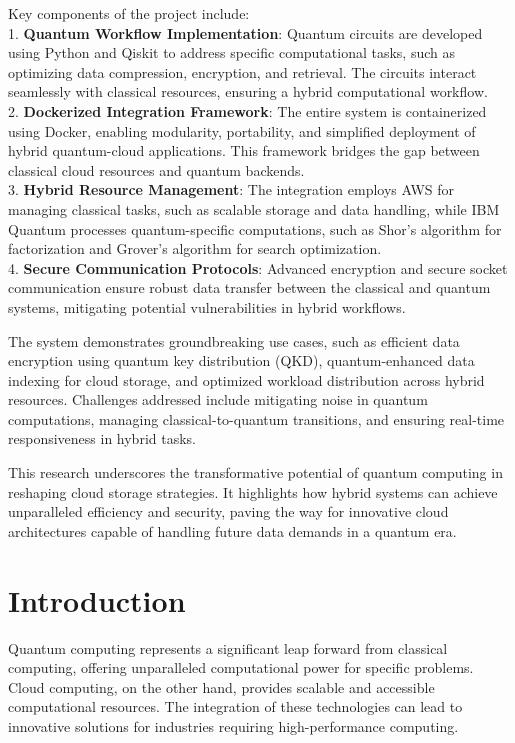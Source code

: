 \documentclass[12pt,a4paper]{article}
\begin{document}
Key components of the project include:  \\
1. \textbf{Quantum Workflow Implementation}: Quantum circuits are developed using Python and Qiskit to address specific computational tasks, such as optimizing data compression, encryption, and retrieval. The circuits interact seamlessly with classical resources, ensuring a hybrid computational workflow.  \\
2. \textbf{Dockerized Integration Framework}: The entire system is containerized using Docker, enabling modularity, portability, and simplified deployment of hybrid quantum-cloud applications. This framework bridges the gap between classical cloud resources and quantum backends.  \\
3. \textbf{Hybrid Resource Management}: The integration employs AWS for managing classical tasks, such as scalable storage and data handling, while IBM Quantum processes quantum-specific computations, such as Shor’s algorithm for factorization and Grover’s algorithm for search optimization.  \\
4. \textbf{Secure Communication Protocols}: Advanced encryption and secure socket communication ensure robust data transfer between the classical and quantum systems, mitigating potential vulnerabilities in hybrid workflows.  

The system demonstrates groundbreaking use cases, such as efficient data encryption using quantum key distribution (QKD), quantum-enhanced data indexing for cloud storage, and optimized workload distribution across hybrid resources. Challenges addressed include mitigating noise in quantum computations, managing classical-to-quantum transitions, and ensuring real-time responsiveness in hybrid tasks.  

This research underscores the transformative potential of quantum computing in reshaping cloud storage strategies. It highlights how hybrid systems can achieve unparalleled efficiency and security, paving the way for innovative cloud architectures capable of handling future data demands in a quantum era.
\newpage

\section{Introduction}
Quantum computing represents a significant leap forward from classical computing, offering unparalleled computational power for specific problems. Cloud computing, on the other hand, provides scalable and accessible computational resources. The integration of these technologies can lead to innovative solutions for industries requiring high-performance computing.
\end{document}
